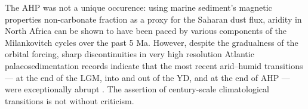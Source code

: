 \documentclass[a4paper]{article}
\begin{document}
The AHP was not a unique occurence: using marine sediment's magnetic properties \parencite{bloemendal1989evidence, larrasoana2003three}non-carbonate fraction \parencite{tiedemann1994astronomic} as a proxy for the Saharan dust flux, aridity in North Africa can be shown to have been paced by various components of the Milankovitch cycles over the past 5 Ma.
However, despite the gradualness of the orbital forcing, sharp discontinuities in very high resolution Atlantic palaeosedimentation records indicate that the most recent arid--humid transitions --- at the end of the LGM, into and out of the YD, and at the end of AHP --- were exceptionally abrupt \cite{demenocal2000abrupt}.
The assertion of century-scale climatological transitions is not without criticism.


\printbibliography{}
\end{document}
